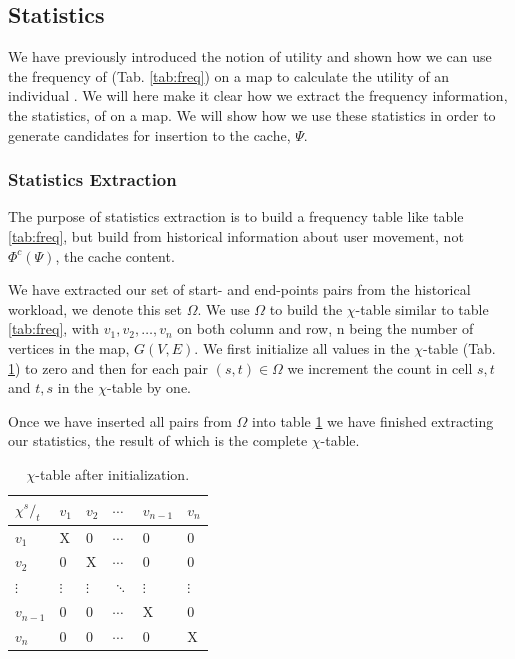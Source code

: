 



\subsection{Statistics}

We have previously introduced the notion of utility and shown how we can use the frequency of \spaths (Tab. \ref{tab:freq}) on a map to calculate the utility of an individual \spathns. We will here make it clear how we extract the frequency information, the statistics, of \spaths on a map. We will show how we use these statistics in order to generate \spath candidates for insertion to the cache, $\Psi$.

\subsubsection{Statistics Extraction}\label{sec:statextract}


The purpose of statistics extraction is to build a frequency table like table \ref{tab:freq}, but build from historical information about user movement, not $\Phi^c(\Psi)$, the cache content.

We have extracted our set of start- and end-points pairs from the historical workload, we denote this set $\Omega$. We use $\Omega$ to build the $\chi$-table similar to table \ref{tab:freq}, with $v_1,v_2,\ldots,v_n$ on both column and row, n being the number of vertices in the map, $G(V,E)$. We first initialize all values in the $\chi$-table (Tab. \ref{tab:chitable}) to zero and then for each pair $(s,t) \in \Omega$ we increment the count in cell $s,t$ and $t,s$ in the $\chi$-table by one.

Once we have inserted all pairs from $\Omega$ into table \ref{tab:chitable} we have finished extracting our statistics, the result of which is the complete $\chi$-table.

\begin{table}
\center
\begin{tabular}{|l||l|l|l|l|l|}
\textbf{$\chi {^s/_t}$}	& $v_1$		& $v_2$		& $\cdots$	& $v_{n-1}$	& $v_n$	\\\hline
$v_1$			& X		& 0		& $\cdots$	& 0		& 0	 \\
$v_2$			& 0		& X		& $\cdots$	& 0		& 0	 \\
$\vdots$		& $\vdots$	& $\vdots$	& $\ddots$	& $\vdots$	& $\vdots$ \\
$v_{n-1}$		& 0		& 0		& $\cdots$	& X		& 0	 \\
$v_n$			& 0		& 0		& $\cdots$	& 0		& X	 \\
\end{tabular}
\caption{$\chi$-table after initialization.}
\label{tab:chitable}
\end{table}

